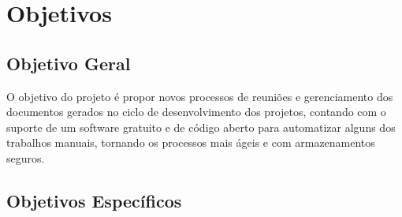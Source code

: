 \chapter[Objetivos]{Objetivos}
\label{cp:objetivos}

\section{Objetivo Geral}

O objetivo do projeto é propor novos processos de reuniões e gerenciamento dos documentos gerados no ciclo de desenvolvimento dos projetos, contando com o suporte de um software gratuito e de código aberto para automatizar alguns dos trabalhos manuais, tornando os processos mais ágeis e com armazenamentos seguros.

\section{Objetivos Específicos} 


